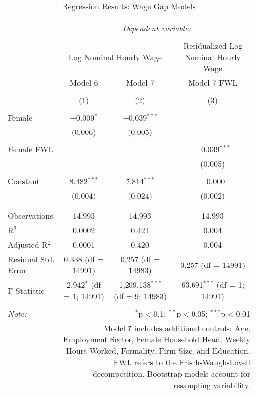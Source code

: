 
\begin{table}[!htbp] \centering 
  \caption{Regression Results: Wage Gap Models} 
  \label{} 
\begin{tabular}{@{\extracolsep{5pt}}lccc} 
\\[-1.8ex]\hline 
\hline \\[-1.8ex] 
 & \multicolumn{3}{c}{\textit{Dependent variable:}} \\ 
\cline{2-4} 
\\[-1.8ex] & \multicolumn{2}{c}{Log Nominal Hourly Wage} & Residualized Log Nominal Hourly Wage \\ 
 & Model 6 & Model 7 & Model 7 FWL \\ 
\\[-1.8ex] & (1) & (2) & (3)\\ 
\hline \\[-1.8ex] 
 Female & $-$0.009$^{*}$ & $-$0.039$^{***}$ &  \\ 
  & (0.006) & (0.005) &  \\ 
  & & & \\ 
 Female FWL &  &  & $-$0.039$^{***}$ \\ 
  &  &  & (0.005) \\ 
  & & & \\ 
 Constant & 8.482$^{***}$ & 7.814$^{***}$ & $-$0.000 \\ 
  & (0.004) & (0.024) & (0.002) \\ 
  & & & \\ 
\hline \\[-1.8ex] 
Observations & 14,993 & 14,993 & 14,993 \\ 
R$^{2}$ & 0.0002 & 0.421 & 0.004 \\ 
Adjusted R$^{2}$ & 0.0001 & 0.420 & 0.004 \\ 
Residual Std. Error & 0.338 (df = 14991) & 0.257 (df = 14983) & 0.257 (df = 14991) \\ 
F Statistic & 2.942$^{*}$ (df = 1; 14991) & 1,209.138$^{***}$ (df = 9; 14983) & 63.691$^{***}$ (df = 1; 14991) \\ 
\hline 
\hline \\[-1.8ex] 
\textit{Note:}  & \multicolumn{3}{r}{$^{*}$p$<$0.1; $^{**}$p$<$0.05; $^{***}$p$<$0.01} \\ 
 & \multicolumn{3}{r}{Model 7 includes additional controls: Age, Employment Sector, Female Household Head, Weekly Hours Worked, Formality, Firm Size, and Education. FWL refers to the Frisch-Waugh-Lovell decomposition. Bootstrap models account for resampling variability.} \\ 
\end{tabular} 
\end{table} 
